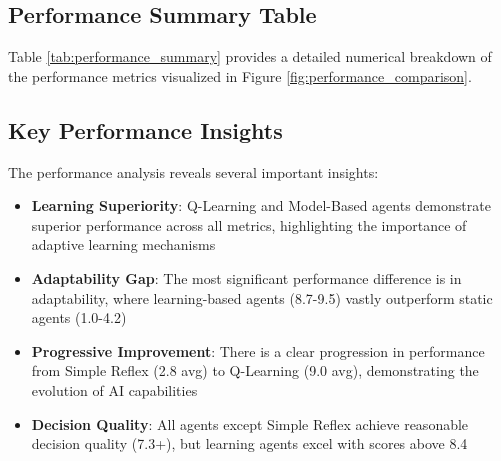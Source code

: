 \documentclass[11pt,a4paper]{article}
\begin{document}
\subsection{Performance Summary Table}

Table \ref{tab:performance_summary} provides a detailed numerical breakdown of the performance metrics visualized in Figure \ref{fig:performance_comparison}.

\begin{table}[H]
\centering
\caption{Detailed Performance Metrics Summary}
\label{tab:performance_summary}
\end{table}

\subsection{Key Performance Insights}

The performance analysis reveals several important insights:

\begin{itemize}
\item \textbf{Learning Superiority}: Q-Learning and Model-Based agents demonstrate superior performance across all metrics, highlighting the importance of adaptive learning mechanisms
\item \textbf{Adaptability Gap}: The most significant performance difference is in adaptability, where learning-based agents (8.7-9.5) vastly outperform static agents (1.0-4.2)
\item \textbf{Progressive Improvement}: There is a clear progression in performance from Simple Reflex (2.8 avg) to Q-Learning (9.0 avg), demonstrating the evolution of AI capabilities
\item \textbf{Decision Quality}: All agents except Simple Reflex achieve reasonable decision quality (7.3+), but learning agents excel with scores above 8.4
\end{itemize}
\end{document}
